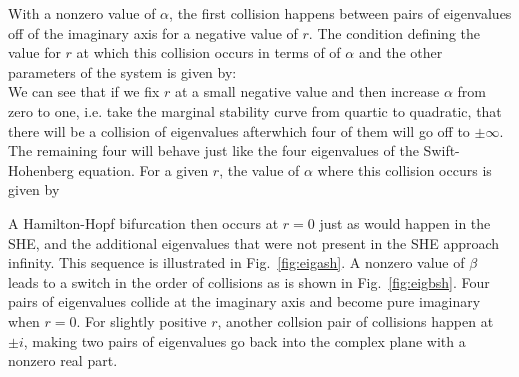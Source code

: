 \documentclass[../main/FlatMarginalStability.tex]{subfiles}
\begin{document}
 With a nonzero value of $\alpha$, the first collision happens between pairs of eigenvalues off of the imaginary axis for a negative value of $r$. The condition defining the value for $r$ at which this collision occurs in terms of of $\alpha$ and the other parameters of the system is given by:
\begin{equation}
\end{equation}
We can see that if we fix $r$ at a small negative value and then increase $\alpha$ from zero to one, i.e. take the marginal stability curve from quartic to quadratic, that there will be a collision of eigenvalues afterwhich four of them will go off to $\pm \infty$.  The remaining four will behave just like the four eigenvalues of the Swift-Hohenberg equation.  For a given $r$, the value of $\alpha$ where this collision occurs is given by   
\begin{equation}
\end{equation}

A Hamilton-Hopf bifurcation then occurs at $r=0$ just as would happen in the SHE, and the additional eigenvalues that were not present in the SHE approach infinity.  This sequence is illustrated in Fig.~\ref{fig:eigash}.
\FIGeigash
A nonzero value of $\beta$ leads to a switch in the order of collisions as is shown in Fig.~\ref{fig:eigbsh}.  Four pairs of eigenvalues collide at the imaginary axis and become pure imaginary when $r=0$.  For slightly positive $r$, another collsion pair of collisions happen at $\pm i$, making two pairs of eigenvalues go back into the complex plane with a nonzero real part. 
\FIGeigbsh
\end{document}
